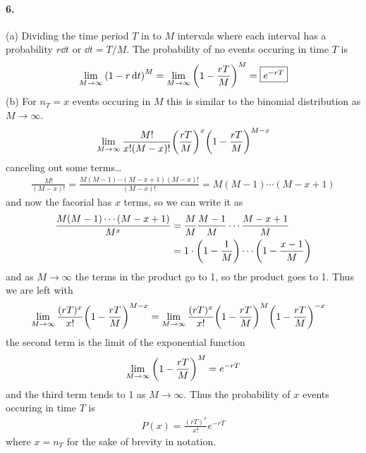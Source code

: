 \documentclass[../main.tex]{subfiles}
\begin{document}
\paragraph{6.} (a) Dividing the time period $T$ in to $M$ intervals where each interval has a 
probability $r \dd{t}$ or $\dd{t} = T/M$. The probability of no events occuring in time $T$ is
\begin{align*}
    \lim_{M \to \infty} \qt(1 - r \dd{t})^M = \lim_{M \to \infty} \qt(1 - \frac{rT}{M})^M =
    \boxed{ e^{-rT}}
\end{align*} 
(b) For $n_T = x$ events occuring in $M$ this is similar to the binomial distribution as $M \to \infty$. 
\begin{align*}
    \lim_{M \to \infty }\frac{M!}{x! (M - x)!} \qt(\frac{rT}{M})^x
        \qt(1 - \frac{rT}{M})^{M - x}
\end{align*}
canceling out some terms\dots
\begin{align*}
    \frac{M!}{(M-x)!} = \frac{M(M-1)\cdots(M-x+1)(M-x)!}{(M-x)!} = M(M-1)\cdots(M-x+1)
\end{align*}
and now the facorial has $x$ terms, so we can write it as
\begin{align*}
    \frac{M(M-1)\cdots(M-x+1)}{M^x} &= \frac{M}{M} \frac{M-1}{M} \cdots \frac{M-x+1}{M} \\
    &= 1 \cdot \qt(1 - \frac{1}{M}) \cdots \qt(1 - \frac{x-1}{M})
\end{align*}
and as $M \to \infty$ the terms in the product go to 1, so the product goes to 1. Thus we are left
with
\begin{align*}
    \lim_{M \to \infty } \frac{(rT)^x}{x!} \qt(1 - \frac{rT}{M})^{M - x} &=
    \lim_{M \to \infty } \frac{(rT)^x}{x!} \qt(1 - \frac{rT}{M})^{M}
    \qt(1 - \frac{rT}{M})^{-x}
\end{align*}
the second term is the limit of the exponential function
\begin{align*}
    \lim_{M \to \infty } \qt(1 - \frac{rT}{M})^{M} = e^{-rT}
\end{align*}
and the third term tends to 1 as $M \to \infty$. Thus the probability of $x$ events occuring in
time $T$ is
\begin{align*}
    \boxed{P(x) = \frac{(rT)^x}{x!} e^{-rT}}
\end{align*}
where $x = n_T$ for the sake of brevity in notation.
\end{document}
